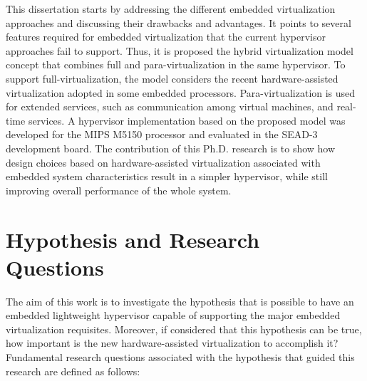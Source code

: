 This dissertation starts by addressing the different embedded virtualization approaches and discussing their drawbacks and advantages. It points to several features required for embedded virtualization that the current hypervisor approaches fail to support. Thus, it is proposed the hybrid virtualization model concept that combines full and para-virtualization in the same hypervisor. To support full-virtualization, the model considers the recent hardware-assisted virtualization adopted in some embedded processors. Para-virtualization is used for extended services, such as communication among virtual machines, and real-time services. A hypervisor implementation based on the proposed model was developed for the MIPS M5150 processor and evaluated in the SEAD-3 development board. The contribution of this Ph.D. research is to show how design choices based on hardware-assisted virtualization associated with embedded system characteristics result in a simpler hypervisor, while still improving overall performance of the whole system. 


\section{Hypothesis and Research Questions}

The aim of this work is to investigate the hypothesis that is possible to have an embedded lightweight hypervisor capable of supporting the major embedded virtualization requisites. Moreover, if considered that this hypothesis can be true, how important is the new hardware-assisted virtualization to accomplish it? Fundamental research questions associated with the hypothesis that guided this research are defined as follows:


